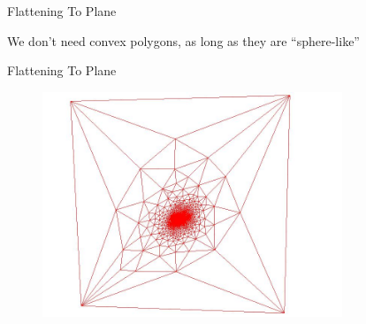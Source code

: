 \documentclass{beamer}
\begin{document}
\begin{frame}{Flattening To Plane}

We don't need convex polygons, as long as they are ``sphere-like''


\end{frame}

\begin{frame}{Flattening To Plane}

\begin{figure}[t]
    \includegraphics[width=0.8\textwidth]{homerparam2.jpg}
\end{figure}

\end{frame}
\end{document}
